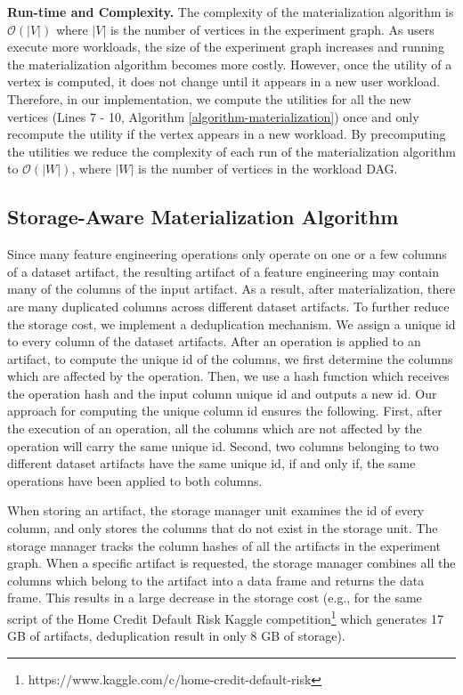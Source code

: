 \textbf{Run-time and Complexity.}
The complexity of the materialization algorithm is $\mathcal{O}(|V|)$ where $|V|$ is the number of vertices in the experiment graph.
As users execute more workloads, the size of the experiment graph increases and running the materialization algorithm becomes more costly.
However, once the utility of a vertex is computed, it does not change until it appears in a new user workload.
Therefore, in our implementation, we compute the utilities for all the new vertices (Lines 7 - 10, Algorithm \ref{algorithm-materialization}) once and only recompute the utility if the vertex appears in a new workload.
By precomputing the utilities we reduce the complexity of each run of the materialization algorithm to $\mathcal{O}(|W|)$, where $|W|$ is the number of vertices in the workload DAG.

\subsection{Storage-Aware Materialization Algorithm}
Since many feature engineering operations only operate on one or a few columns of a dataset artifact, the resulting artifact of a feature engineering may contain many of the columns of the input artifact.
As a result, after materialization, there are many duplicated columns across different dataset artifacts.
To further reduce the storage cost, we implement a deduplication mechanism.
We assign a unique id to every column of the dataset artifacts.
After an operation is applied to an artifact, to compute the unique id of the columns, we first determine the columns which are affected by the operation.
Then, we use a hash function which receives the operation hash and the input column unique id and outputs a new id.
Our approach for computing the unique column id ensures the following.
First, after the execution of an operation, all the columns which are not affected by the operation will carry the same unique id.
Second, two columns belonging to two different dataset artifacts have the same unique id, if and only if, the same operations have been applied to both columns.

When storing an artifact, the storage manager unit examines the id of every column, and only stores the columns that do not exist in the storage unit.
The storage manager tracks the column hashes of all the artifacts in the experiment graph.
When a specific artifact is requested, the storage manager combines all the columns which belong to the artifact into a data frame and returns the data frame.
This results in a large decrease in the storage cost (e.g., for the same script of the Home Credit Default Risk Kaggle competition\footnote{https://www.kaggle.com/c/home-credit-default-risk} which generates 17 GB of artifacts, deduplication result in only 8 GB of storage).

